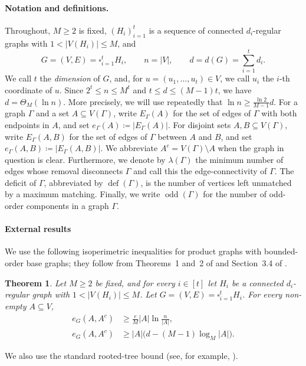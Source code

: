 \documentclass[10pt,a4paper]{article}
\newtheorem{thm}{Theorem}[section]
\newcommand{\defi}{\operatorname{def}}
\newcommand{\odd}{\operatorname{odd}}
\begin{document}
\paragraph{Notation and definitions.}
Throughout, $M\ge2$ is fixed, $(H_i)_{i=1}^t$ is a sequence of connected $d_i$-regular graphs with $1<|V(H_i)|\le M$, and
\[
  G=(V,E)=\square_{i=1}^tH_i,
  \qquad n=|V|,
  \qquad d=d(G)=\sum_{i=1}^td_i.
\]
We call $t$ the \emph{dimension} of $G$, and, for $u=(u_1,\ldots,u_t)\in V$, we call $u_i$ the $i$-th coordinate of $u$.
Since $2^t\le n\le M^t$ and $t\le d\le(M-1)t$, we have $d=\Theta_M(\ln n)$. More precisely, we will use repeatedly that $\ln n \geq \frac{\ln 2}{M-1} d$.
For a graph $\Gamma$ and a set $A\subseteq V(\Gamma)$, write $E_\Gamma(A)$ for the set of edges of $\Gamma$ with both endpoints in $A$, and set $e_\Gamma(A)\coloneqq |E_\Gamma(A)|$.
For disjoint sets $A,B\subseteq V(\Gamma)$, write $E_\Gamma(A,B)$ for the set of edges of $\Gamma$ between $A$ and $B$, and set $e_\Gamma(A,B)\coloneqq |E_\Gamma(A,B)|$.
We abbreviate $A^c=V(\Gamma)\setminus A$ when the graph in question is clear. Furthermore, we denote by $\lambda(\Gamma)$ the minimum number of edges whose removal disconnects $\Gamma$ and call this the edge-connectivity of $\Gamma$. The deficit of $\Gamma$, abbreviated by $\defi(\Gamma)$, is the number of vertices left unmatched by a maximum matching.
Finally, we write $\odd(\Gamma)$ for the number of odd-order components in a graph $\Gamma$.

\paragraph{External results}
We use the following isoperimetric inequalities for product graphs with bounded-order base graphs; they follow from Theorems~1 and~2 of \cite{DEKK24} and Section~3.4 of \cite{DS24}.

\begin{thm}\label{th:expansion}
Let $M\ge2$ be fixed, and for every $i\in[t]$ let $H_i$ be a connected $d_i$-regular graph with $1<|V(H_i)|\le M$.
Let $G=(V, E)=\square_{i=1}^tH_i$. For every non-empty $A\subseteq V$,
\begin{align}
  e_G(A,A^c)&\ge \frac{e}{M}|A|\ln\frac{n}{|A|},\label{eq:expansion-log}\\
  e_G(A,A^c)&\ge |A|\bigl(d-(M-1)\log_M|A|\bigr).\label{eq:expansion-local}
\end{align}
\end{thm}

We also use the standard rooted-tree bound (see, for example, \cite[Lemma~2]{BFM98}).
\end{document}
